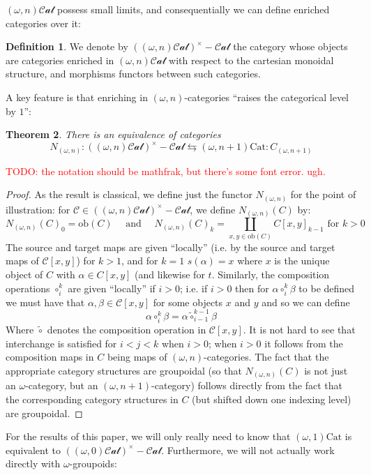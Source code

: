 \documentclass[12pt]{article}
\newtheorem{theorem}{Theorem}[section]
\theoremstyle{definition}
\newtheorem{definition}[theorem]{Definition}
\newcommand{\TODO}[1]{\textcolor{red}{TODO: {#1}}}
\newcommand{\C}{\mathcal{C}}
\newcommand{\omegancat}[1]{(\omega,#1)\mathcal{Cat}}
\newcommand{\cartesiancat}[1]{((\omega, #1)\mathcal{Cat})^\times{-}\mathcal{Cat}}
\newcommand{\ob}{\text{ob}}
\newcommand{\omegannerve}[1]{N_{(\omega,#1)}}
\newcommand{\omeganrigidification}[1]{C_{(\omega,#1)}}
\begin{document}
	$\omegancat{n}$ possess small limits, and consequentially we can define enriched categories over it:
	\begin{definition}
		We denote by $\cartesiancat{n}$ the category whose objects are categories enriched in $\omegancat{n}$ with respect to the cartesian monoidal structure, and morphisms functors between such categories. 
	\end{definition}
	A key feature is that enriching in $(\omega,n)$-categories ``raises the categorical level by $1$'':
	\begin{theorem}\label{thm:enriched-strict-equivalence}
		There is an equivalence of categories
			$$\omegannerve{n}:\cartesiancat{n} \leftrightarrows (\omega,n+1)\text{Cat}: \omeganrigidification{n+1}$$ 
	\end{theorem}
	\TODO{the notation should be mathfrak, but there's some font error. ugh.}
	\begin{proof}
		As the result is classical, we define just the functor $\omegannerve{n}$ for the point of illustration: for $\C \in \cartesiancat{n}$, we define $\omegannerve{n}(C)$ by:
		$$\omegannerve{n}(C)_0 = \ob(C) \quad \text{ and } \quad \omegannerve{n}(C)_k= \coprod_{x,y \in \ob(C)} C[x,y]_{k-1}\text{ for } k > 0$$ 
		The source and target maps are given ``locally'' (i.e. by the source and target maps of $\C[x,y]$) for $k > 1$, and for $k = 1$ $s(\alpha) = x$ where $x$ is the unique object of $C$ with $\alpha \in C[x,y]$ (and likewise for $t$. 
		Similarly, the composition operations $\circ_i^k$ are given ``locally'' if $i > 0$; i.e. if $i > 0$ then for $\alpha \circ_i^k \beta$ to be defined we must have that $\alpha, \beta \in \C[x,y]$ for some objects $x$ and $y$ and so we can define 
		$$\alpha \circ_i^k \beta = \alpha \tilde{\circ}_{i-1}^{k-1} \beta$$
		Where $\tilde{\circ}$ denotes the composition operation in $\C[x,y]$. 
		It is not hard to see that interchange is satisfied for $i < j < k$ when $i > 0$; when $i > 0$ it follows from the composition maps in $C$ being maps of $(\omega,n)$-categories. 
		The fact that the appropriate category structures are groupoidal (so that $\omegannerve{n}(C)$ is not just an $\omega$-category, but an $(\omega,n+1)$-category) follows directly from the fact that the corresponding category structures in $C$ (but shifted down one indexing level) are groupoidal.
	\end{proof}
	For the results of this paper, we will only really need to know that $(\omega,1)\text{Cat}$ is equivalent to $\cartesiancat{0}$. 
	Furthermore, we will not actually work directly with $\omega$-groupoids: 
\end{document}
